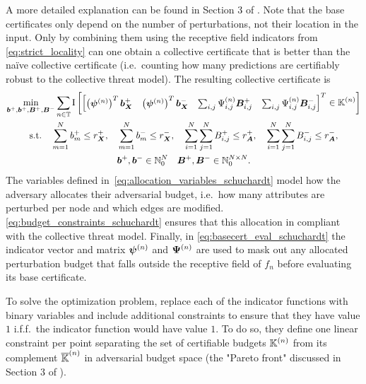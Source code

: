 A more detailed explanation can be found in Section 3 of \citep{Schuchardt2021}.
Note that the base certificates only depend on the number of perturbations, not their location in the input.
Only by combining them using the receptive field indicators from \autoref{eq:strict_locality} can one obtain a collective certificate that is better than the na\"ive collective certificate (i.e.~counting how many predictions are certifiably robust to the collective threat model). The resulting collective certificate is
\begin{gather}\label{eq:basecert_eval_schuchardt}
    \min_{{\bm{b}}^{+},{\bm{b}}^{+},{\bm{B}}^{+},{\bm{B}}^{-}}
    \sum_{n \in {\mathbb{T}}} \mathrm{I}\left[
    \begin{bmatrix}
    \left({\bm{\psi}}^{(n)}\right)^T {\bm{b}}_{\bm{X}}^{+}
    &
    \left({\bm{\psi}}^{(n)}\right)^T {\bm{b}}_{\bm{X}}^{-}
    &
    \sum_{i,j}{\Psi}^{(n)}_{i,j} {\bm{B}}_{i,j}^{+}
    &
    \sum_{i,j}{\Psi}^{(n)}_{i,j} {\bm{B}}_{i,j}^{-}
    \end{bmatrix}^T
    \in {\mathbb{K}}^{(n)}
    \right]
    \\\label{eq:budget_constraints_schuchardt}
    \text{s.t.} \quad
    \sum_{m=1}^N {b}^{+}_m \leq r_{\bm{X}}^{+},
    \quad
    \sum_{m=1}^N {b}^{-}_m \leq r_{\bm{X}}^{-},
    \quad
    \sum_{i=1}^N \sum_{j=1}^N {B}^{+}_{i,j} \leq r_{\bm{A}}^{+},
    \quad
    \sum_{i=1}^N \sum_{j=1}^N {B}^{-}_{i,j} \leq r_{\bm{A}}^{-},
    \\
    \label{eq:allocation_variables_schuchardt}
    {\bm{b}}^{+}, {\bm{b}}^{-} \in {\mathbb{N}}_0^{N} \quad {\bm{B}}^{+}, {\bm{B}}^{-} \in {\mathbb{N}}_0^{N \times N}.
\end{gather}
The variables defined in~\autoref{eq:allocation_variables_schuchardt} model how the adversary allocates their adversarial budget, i.e.~how many attributes are perturbed per node and which edges are modified.
\autoref{eq:budget_constraints_schuchardt} ensures that this allocation in compliant with the collective threat model.
Finally, in \autoref{eq:basecert_eval_schuchardt} the indicator vector and matrix ${\bm{\psi}}^{(n)}$ and ${\bm{\Psi}}^{(n)}$ are used to mask out any allocated perturbation budget that falls outside the receptive field of $f_n$ before evaluating its base certificate.

To solve the optimization problem, \citet{Schuchardt2021} replace each of the indicator functions with binary variables and include additional constraints to ensure that they have value $1$ i.f.f.\ the indicator function would have value $1$.
To do so, they define one linear constraint per point separating the set of certifiable budgets ${\mathbb{K}}^{(n)}$ from its complement $\overline{{\mathbb{K}}}^{(n)}$ in adversarial budget space (the "Pareto front" discussed in Section 3 of \citep{Schuchardt2021}).

